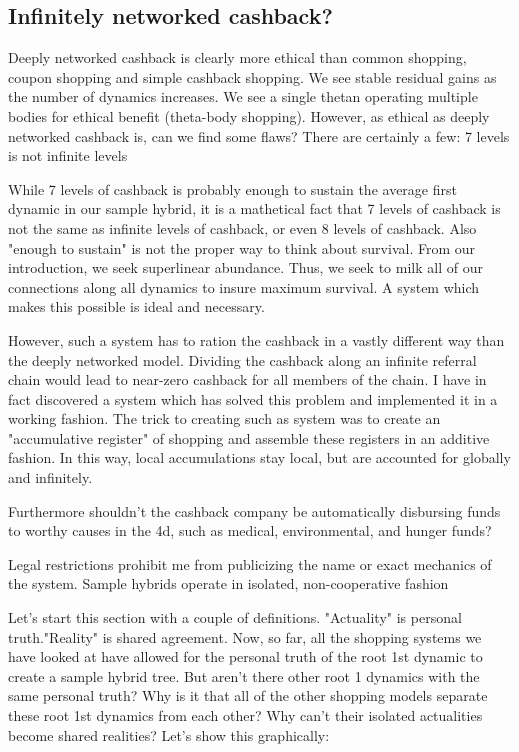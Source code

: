 \documentclass{article}%
\begin{document}
\subsection{Infinitely networked cashback?}

Deeply networked cashback is clearly more ethical than common shopping, coupon shopping and simple cashback shopping. We see stable residual gains as the number of dynamics increases. We see a single thetan operating multiple bodies for ethical benefit (theta-body shopping). However, as ethical as deeply networked cashback is, can we find some flaws? There are certainly a few:
7 levels is not infinite levels

While 7 levels of cashback is probably enough to sustain the average first dynamic in our sample hybrid, it is a mathetical fact that 7 levels of cashback is not the same as infinite levels of cashback, or even 8 levels of cashback. Also "enough to sustain" is not the proper way to think about survival. From our introduction, we seek superlinear abundance. Thus, we seek to milk all of our connections along all dynamics to insure maximum survival. A system which makes this possible is ideal and necessary.

However, such a system has to ration the cashback in a vastly different way than the deeply networked model. Dividing the cashback along an infinite referral chain would lead to near-zero cashback for all members of the chain. I have in fact discovered a system which has solved this problem and implemented it in a working fashion. The trick to creating such as system was to create an "accumulative register" of shopping and assemble these registers in an additive fashion. In this way, local accumulations stay local, but are accounted for globally and infinitely.

Furthermore shouldn't the cashback company be automatically disbursing funds to worthy causes in the 4d, such as medical, environmental, and hunger funds?

Legal restrictions prohibit me from publicizing the name or exact mechanics of the system.
Sample hybrids operate in isolated, non-cooperative fashion

Let's start this section with a couple of definitions. "Actuality" is personal truth."Reality" is shared agreement. Now, so far, all the shopping systems we have looked at have allowed for the personal truth of the root 1st dynamic to create a sample hybrid tree. But aren't there other root 1 dynamics with the same personal truth? Why is it that all of the other shopping models separate these root 1st dynamics from each other? Why can't their isolated actualities become shared realities? Let's show this graphically:
\end{document}

